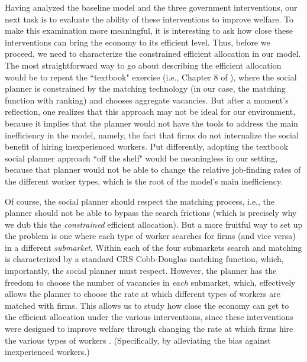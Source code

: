 \documentclass[12pt]{article} %
\theoremstyle{definition}
\begin{document}
Having analyzed the baseline model and the three government interventions, our next task is to evaluate the ability of these interventions to improve welfare. To make this examination more meaningful, it is interesting to ask how close these interventions can bring the economy to its efficient level. Thus, before we proceed, we need to characterize the constrained efficient allocation in our model. The most straightforward way to go about describing the efficient allocation would be to repeat the ``textbook" exercise (i.e., Chapter 8 of \citealt{pissarides2000equilibrium}), where the social planner is constrained by the matching technology (in our case, the \citealt{petrongolo2001looking} matching function with ranking) and chooses aggregate vacancies. But after a moment's reflection, one realizes that this approach may not be ideal for our environment, because it implies that the planner would not have the tools to address the main inefficiency in the model, namely, the fact that firms do not internalize the social benefit of hiring inexperienced workers.
Put differently, adopting the textbook social planner approach ``off the shelf" would be meaningless in our setting, because that planner would not be able to change the relative job-finding rates of the different worker types, which is the root of the model's main inefficiency. 


Of course, the social planner should respect the matching process, i.e., the planner should not be able to bypass the search frictions (which is precisely why we dub this the \textit{constrained} efficient allocation). But a more fruitful way to set up the problem is one where each type of worker searches for firms (and vice versa) in a different \textit{submarket}. Within each of the four submarkets search and matching is characterized by a standard CRS Cobb-Douglas matching function, which, importantly, the social planner must respect. However, the planner has the freedom to choose the number of vacancies in \textit{each} submarket, which, effectively allows the planner to choose the rate at which different types of workers are matched with firms. This allows us to study how close the economy can get to the efficient allocation under the various interventions, since these interventions were designed to improve welfare through changing the rate at which firms hire the various types of workers . (Specifically, by alleviating the bias against inexperienced workers.) 
\end{document}
